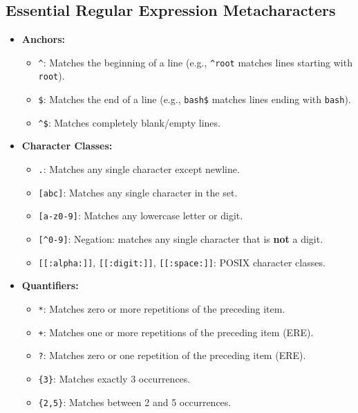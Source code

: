 \subsection{Essential Regular Expression Metacharacters}
\begin{itemize}[leftmargin=1.5em]
    \item \textbf{Anchors:}
    \begin{itemize}
        \item \texttt{\^{}}: Matches the beginning of a line (e.g., \texttt{\^{}root} matches lines starting with \texttt{root}).
        \item \texttt{\$}: Matches the end of a line (e.g., \texttt{bash\$} matches lines ending with \texttt{bash}).
        \item \texttt{\^{}\$}: Matches completely blank/empty lines.
    \end{itemize}
    \item \textbf{Character Classes:}
    \begin{itemize}
        \item \texttt{.}: Matches any single character except newline.
        \item \texttt{[abc]}: Matches any single character in the set.
        \item \texttt{[a-z0-9]}: Matches any lowercase letter or digit.
        \item \texttt{[\^{}0-9]}: Negation: matches any single character that is \textbf{not} a digit.
        \item \texttt{[[:alpha:]]}, \texttt{[[:digit:]]}, \texttt{[[:space:]]}: POSIX character classes.
    \end{itemize}
    \item \textbf{Quantifiers:}
    \begin{itemize}
        \item \texttt{*}: Matches zero or more repetitions of the preceding item.
        \item \texttt{+}: Matches one or more repetitions of the preceding item (ERE).
        \item \texttt{?}: Matches zero or one repetition of the preceding item (ERE).
        \item \texttt{\{3\}}: Matches exactly 3 occurrences.
        \item \texttt{\{2,5\}}: Matches between 2 and 5 occurrences.
    \end{itemize}
\end{itemize}

